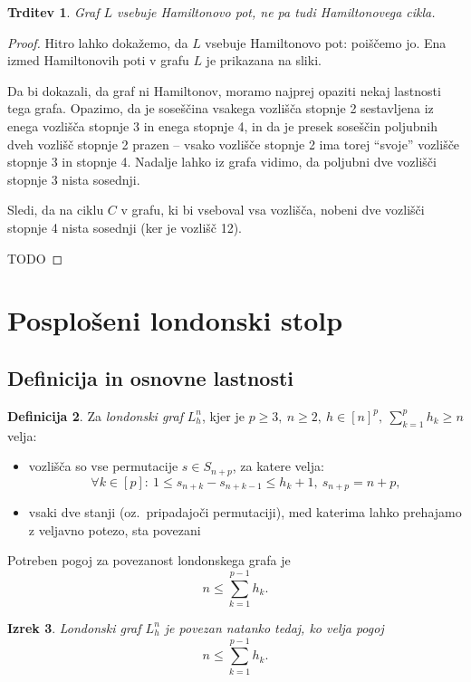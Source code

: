 \documentclass[12pt,a4paper]{amsart}
\theoremstyle{definition} %
\newtheorem{definicija}{Definicija}[section]
\theoremstyle{plain} %
\newtheorem{izrek}[definicija]{Izrek}
\newtheorem{trditev}[definicija]{Trditev}
\begin{document}
\bigskip

\begin{trditev}
    Graf $L$ vsebuje Hamiltonovo pot, ne pa tudi Hamiltonovega cikla.
\end{trditev}

\begin{proof}
    Hitro lahko dokažemo, da $L$ vsebuje Hamiltonovo pot: poiščemo jo. Ena izmed Hamiltonovih poti v grafu $L$ je prikazana na sliki.
    
    Da bi dokazali, da graf ni Hamiltonov, moramo najprej opaziti nekaj lastnosti tega grafa. Opazimo, da je soseščina vsakega vozlišča stopnje 2 sestavljena iz enega vozlišča stopnje 3 in enega stopnje 4, in da je presek soseščin poljubnih dveh vozlišč stopnje 2 prazen -- vsako vozlišče stopnje 2 ima torej ``svoje'' vozlišče stopnje 3 in stopnje 4. Nadalje lahko iz grafa vidimo, da poljubni dve vozlišči stopnje 3 nista sosednji.
    
    Sledi, da na ciklu $C$ v grafu, ki bi vseboval vsa vozlišča, nobeni dve vozlišči stopnje 4 nista sosednji (ker je vozlišč 12).
    
    TODO
    \qedhere
\end{proof}

\section{Posplošeni londonski stolp}

\subsection{Definicija in osnovne lastnosti}

\begin{definicija}
    Za \emph{londonski graf} $L_h^n$, kjer je $p \geq 3,\ n \geq 2,\ h \in [n]^p,\  \sum_{k=1}^p h_k \geq n$ velja:
    \begin{itemize}
        \item vozlišča so vse permutacije $s \in S_{n+p}$, za katere velja:
        \[\forall k \in [p]:\ 1 \leq s_{n+k} - s_{n+k-1} \leq h_k + 1,\ s_{n+p} = n + p ,\]
        \item vsaki dve stanji (oz.\ pripadajoči permutaciji), med katerima lahko prehajamo z veljavno potezo, sta povezani
    \end{itemize}
\end{definicija}

Potreben pogoj za povezanost londonskega grafa je 
\[ n \leq \sum_{k=1}^{p-1} h_k. \]
\begin{izrek}
    Londonski graf $L_h^n$ je povezan natanko tedaj, ko velja pogoj
    \[ n \leq \sum_{k=1}^{p-1} h_k. \]
\end{izrek}
\end{document}
